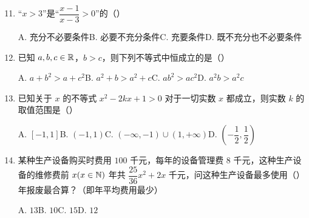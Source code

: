 \documentclass[a4paper,11pt]{article}
\begin{document}

\begin{enumerate}
\setcounter{enumi}{10}

\item “$x>3$”是“$\dfrac{x-1}{x-3}>0$”的\mbox{（\quad）}

\keepwithprev
A. 充分不必要条件\qquad B. 必要不充分条件\qquad C. 充要条件\qquad D. 既不充分也不必要条件

\ifanswer
\solbegin
{}
\solend
\fi

\item 已知 $a,b,c\in\mathbb{R}$，$b>c$，则下列不等式中恒成立的是\mbox{（\quad）}

\keepwithprev
A. $a+b^2>a+c^2$\qquad B. $a^2+b>a^2+c$\qquad C. $ab^2>ac^2$\qquad D. $a^2b>a^2c$

\ifanswer
\solbegin
{}
\solend
\fi

\item 已知关于 $x$ 的不等式 $x^2-2kx+1>0$ 对于一切实数 $x$ 都成立，则实数 $k$ 的取值范围是\mbox{（\quad）}

\keepwithprev
A. $[-1,1]$\qquad B. $(-1,1)$\qquad C. $(-\infty,-1)\cup(1,+\infty)$\qquad D. $\left(-\dfrac12,\dfrac12\right)$

\ifanswer
\solbegin
{}
\solend
\fi

\item 某种生产设备购买时费用 $100$ 千元，每年的设备管理费 $8$ 千元，这种生产设备的维修费前 $x(x\in\mathbb{N})$ 年共 $\dfrac{25}{36}x^2+2x$ 千元，问这种生产设备最多使用\mbox{（\quad）}年报废最合算？（即年平均费用最少）

\keepwithprev
A. $13$\qquad B. $10$\qquad C. $15$\qquad D. $12$

\ifanswer
\solbegin
{}
\solend
\fi

\end{enumerate}
\end{document}
